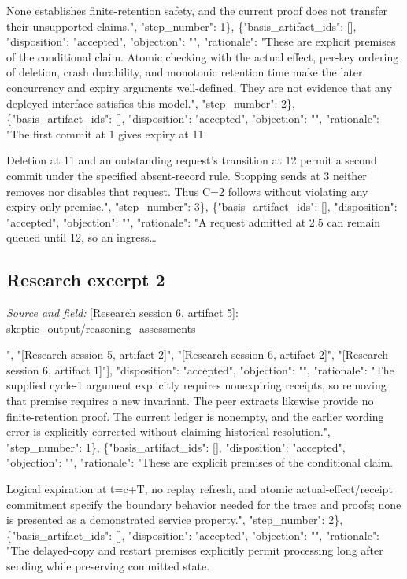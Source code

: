 \documentclass[11pt]{article}
\begin{document}
None establishes finite-retention safety, and the current proof does not transfer their unsupported claims.", "step\_number": 1\}, \{"basis\_artifact\_ids": [], "disposition": "accepted", "objection": "", "rationale": "These are explicit premises of the conditional claim. Atomic checking with the actual effect, per-key ordering of deletion, crash durability, and monotonic retention time make the later concurrency and expiry arguments well-defined. They are not evidence that any deployed interface satisfies this model.", "step\_number": 2\}, \{"basis\_artifact\_ids": [], "disposition": "accepted", "objection": "", "rationale": "The first commit at 1 gives expiry at 11.

Deletion at 11 and an outstanding request's transition at 12 permit a second commit under the specified absent-record rule. Stopping sends at 3 neither removes nor disables that request. Thus C=2 follows without violating any expiry-only premise.", "step\_number": 3\}, \{"basis\_artifact\_ids": [], "disposition": "accepted", "objection": "", "rationale": "A request admitted at 2.5 can remain queued until 12, so an ingress\ldots{}

\subsection{Research excerpt 2}
\textit{Source and field: }[Research session 6, artifact 5]: skeptic\_output/reasoning\_assessments\par
[\{"basis\_artifact\_ids": ["[Research session 6, artifact 3]", "[Research session 5, artifact 2]", "[Research session 6, artifact 2]", "[Research session 6, artifact 1]"], "disposition": "accepted", "objection": "", "rationale": "The supplied cycle-1 argument explicitly requires nonexpiring receipts, so removing that premise requires a new invariant. The peer extracts likewise provide no finite-retention proof. The current ledger is nonempty, and the earlier wording error is explicitly corrected without claiming historical resolution.", "step\_number": 1\}, \{"basis\_artifact\_ids": [], "disposition": "accepted", "objection": "", "rationale": "These are explicit premises of the conditional claim.

Logical expiration at t=c+T, no replay refresh, and atomic actual-effect/receipt commitment specify the boundary behavior needed for the trace and proofs; none is presented as a demonstrated service property.", "step\_number": 2\}, \{"basis\_artifact\_ids": [], "disposition": "accepted", "objection": "", "rationale": "The delayed-copy and restart premises explicitly permit processing long after sending while preserving committed state.
\end{document}
